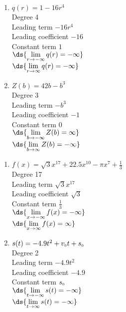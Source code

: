 \documentclass{ximera}
\begin{document}
\begin{multicols}{2}
\begin{enumerate}
\setcounter{enumi}{\value{HW}}

\item $q(r) = 1 - 16r^{4}$\\
Degree 4 \\
Leading term $-16r^{4}$\\
Leading coefficient $-16$\\
Constant term $1$\\
$\ds{\lim_{r \rightarrow - \infty} q(r)  = -\infty}$ \\
$\ds{\lim_{r \rightarrow \infty} q(r)  = -\infty}$ \\


\item $Z(b) = 42b - b^{3}$\\
Degree 3 \\
Leading term $-b^{3}$\\
Leading coefficient $-1$\\
Constant term $0$\\
$\ds{\lim_{b \rightarrow - \infty} Z(b)  = \infty}$ \\
$\ds{\lim_{b \rightarrow  \infty} Z(b)  =  - \infty}$ \\

\setcounter{HW}{\value{enumi}}
\end{enumerate}
\end{multicols}

\begin{multicols}{2}
\begin{enumerate}
\setcounter{enumi}{\value{HW}}

\item $f(x) = \sqrt{3}x^{17} + 22.5x^{10} - \pi x^{7} + \frac{1}{3}$\\
Degree 17 \\
Leading term $\sqrt{3}x^{17}$\\
Leading coefficient $\sqrt{3}$\\
Constant term $\frac{1}{3}$\\
$\ds{\lim_{x \rightarrow - \infty} f(x)  = -\infty}$ \\
$\ds{\lim_{x \rightarrow  \infty} f(x)  = \infty}$ \\



\item $s(t) = -4.9t^{2} + v_{\mbox{\tiny $0$}}t + s_{\mbox{\tiny $0$}}$\\
Degree 2 \\
Leading term $-4.9t^{2}$\\
Leading coefficient $-4.9$\\
Constant term $s_{\mbox{\tiny $0$}}$\\
$\ds{\lim_{t \rightarrow - \infty} s(t)  = -\infty}$ \\
$\ds{\lim_{t \rightarrow  \infty} s(t)  = -\infty}$ \\



\setcounter{HW}{\value{enumi}}
\end{enumerate}
\end{multicols}
\end{document}
